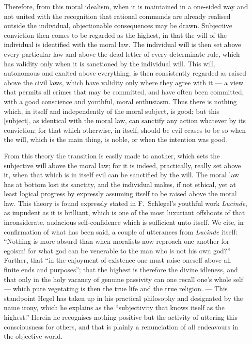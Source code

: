 \documentclass[12pt]{article}
\newcommand{\opage}[1]{\marginnote{\footnotesize\textit{[#1]}}}
\begin{document}
Therefore, from this moral idealism, when it is maintained in a one-sided way and not united with the recognition that rational commands are already realised outside the individual, objectionable consequences may be drawn. Subjective conviction then comes to be regarded as the highest, in that the will of the individual is identified with the moral law. The individual will is then set above every particular law and above the dead letter of every determinate rule, which has validity only when it is sanctioned by the individual will. This will, autonomous and exalted above everything, is then consistently regarded as raised above the civil laws, which have validity only where they agree with it --- a view that permits all crimes that may be committed, and have often been com\opage{155}mitted, with a good conscience and youthful, moral enthusiasm. Thus there is nothing which, in itself and independently of the moral subject, is good; but this [subject], as identical with the moral law, can sanctify any action whatever by its conviction; for that which otherwise, in itself, should be evil ceases to be so when the will, which is the main thing, is noble, or when the intention was good.

From this theory the transition is easily made to another, which sets the subjective will above the moral law; for it is indeed, practically, really set above it, when that which is in itself evil can be sanctified by the will. The moral law has at bottom lost its sanctity, and the individual makes, if not ethical, yet at least logical progress by expressly assuming itself to be raised above the moral law. This theory is found expressly stated in F.\ Schlegel's youthful work \emph{Lucinde}, as impudent as it is brilliant, which is one of the most luxuriant offshoots of that inconsiderate, audacious self-confidence which is sufficient unto itself. We cite, in confirmation of what has been said, a couple of utterances from \emph{Lucinde} itself: ``Nothing is more absurd than when moralists now reproach one another for egoism! for what god can be venerable to the man who is not his own god?'' Further, that ``in the enjoyment of existence one must raise oneself above all finite ends and purposes''; that the highest is therefore the divine idleness, and that only in the holy vacancy of genuine passivity can one recall one's whole self --- which pure vegetating is then the true life and the true religion. --- This standpoint Hegel has taken up in his practical philosophy and designated by the name irony, which he explains as the ``subjectivity that knows itself as the highest.'' Herein he recognises nothing positive but the activity of uttering this consciousness for others, and that is plainly a renunciation of all endeavours in the objective world.
\end{document}
